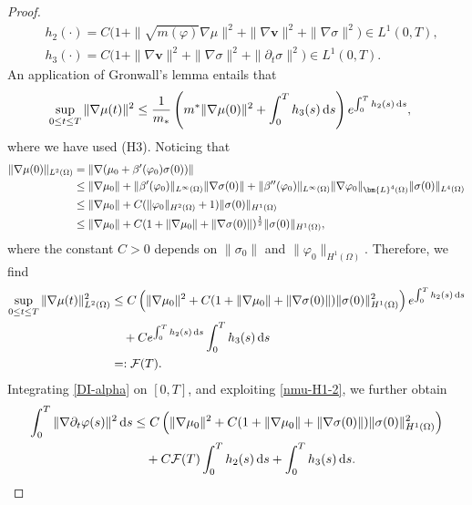 \documentclass[11pt,reqno]{amsart}
\def\d{{\rm d}}
\def\vv{\bm{v}}
\begin{document}
\begin{proof}
%
\begin{align*}
& h_2(\cdot) = C\big(1+ \|\sqrt{m(\varphi)}\nabla \mu\|^2+\|\nabla \vv\|^2+\|\nabla \sigma\|^2\big)\in L^1(0,T),
\\
& h_3(\cdot) = C\big(1+\|\nabla \bm{v}\|^2 +\|\nabla \sigma\|^2 +\|\partial_t\sigma\|^2\big)\in L^1(0,T).
\end{align*}
%
An application of Gronwall's lemma entails that
%
\begin{equation}
\label{nmu-H1}
\begin{split}
\sup_{0\leq t \leq T} \|\nabla \mu(t)\|^2
&\leq \frac{1}{m_*}
  \left(m^*\|\nabla \mu(0)\|^2 + \int_0^T  h_3(s)\,\mathrm{d}s\right)e^{\int_0^T h_2(s)\, \d s},
\end{split}
\end{equation}
%
where we have used (H3). Noticing that
%
\begin{align}
\| \nabla \mu(0)\|_{L^2(\Omega)}
& = \| \nabla ( \mu_0 + \beta'(\varphi_0) \sigma(0))\|
\notag\\
&\leq  \| \nabla \mu_0\|
+   \|\beta'(\varphi_0)\|_{L^\infty(\Omega)}\|\nabla  \sigma(0) \|
 +\|\beta''(\varphi_0)\|_{L^\infty(\Omega)}\|\nabla \varphi_0\|_{\bm{L}^4(\Omega)}\|\sigma(0)\|_{L^4(\Omega)}
\notag\\
&\leq \| \nabla \mu_0\| + C(\|\varphi_0\|_{H^2(\Omega)}+1)\|\sigma(0)\|_{H^1(\Omega)}
\notag\\
&\leq \| \nabla \mu_0\| + C(1+\|\nabla \mu_0\|+\|\nabla \sigma(0)\|)^\frac12\| \sigma(0)\|_{H^1(\Omega)},
\notag
\end{align}
%
where the constant $C>0$ depends on $\|\sigma_0\|$ and $\|\varphi_0\|_{H^1(\Omega)}$.
Therefore, we find
%
\begin{align}
\sup_{0\leq t \leq T}
\| \nabla \mu(t)\|_{L^2(\Omega)}^2
&\leq C
\left( \| \nabla \mu_0\|^2 + C(1+\|\nabla \mu_0\|+\|\nabla \sigma(0)\|) \| \sigma(0)\|_{H^1(\Omega)}^2 \right)e^{\int_0^T h_2(s)\, \d s}
\notag \\
& \quad
+  C e^{\int_0^T h_2(s)\, \d s}\int_0^T  h_3(s)\,\mathrm{d}s
\notag \\
&=: \mathcal{F}(T).
\label{nmu-H1-2}
\end{align}
%
Integrating \eqref{DI-alpha} on $[0,T]$, and exploiting \eqref{nmu-H1-2}, we further obtain
%
\begin{align}
\int_0^T \| \nabla \partial_t \varphi(s)\|^2 \, \d s
&\leq  C
\left( \| \nabla \mu_0\|^2 + C(1+\|\nabla \mu_0\|+\|\nabla \sigma(0)\|) \| \sigma(0)\|_{H^1(\Omega)}^2 \right)
\notag \\
&\quad +C \mathcal{F}(T) \int_0^T h_2(s)\, \d s + \int_0^T  h_3(s)\,\d s.

\end{align}
\end{proof}
\end{document}

